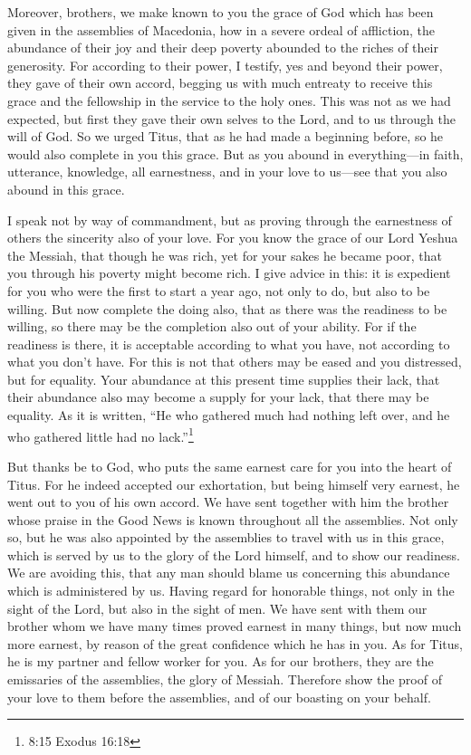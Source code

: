 \mychapter{} \myverse*{}Moreover, brothers, we make known to you the grace of God which
has been given in the assemblies of Macedonia,
\myverse{}how in a severe ordeal of affliction, the abundance of their joy and their deep
poverty abounded to the riches of their generosity.
\myverse{}For according to their power, I testify, yes and beyond their power, they gave
of their own accord,
\myverse{}begging us with much entreaty to receive this grace and the fellowship in the
service to the holy ones.
\myverse{}This was not as we had expected, but first they gave their own selves to the
Lord, and to us through the will of God.
\myverse{}So we urged Titus, that as he had made a beginning before, so he would also
complete in you this grace.
\myverse{}But as you abound in everything—in faith, utterance, knowledge, all earnestness,
and in your love to us—see that you also abound in this grace.

\myverse{}I speak not by way of commandment, but as proving through the earnestness
of others the sincerity also of your love.
\myverse{}For you know the grace of our Lord Yeshua the Messiah, that though he was rich,
yet for your sakes he became poor, that you through his poverty might become rich.
\myverse{}I give advice in this: it is expedient for you who were the first to start
a year ago, not only to do, but also to be willing.
\myverse{}But now complete the doing also, that as there was the readiness to be willing,
so there may be the completion also out of your ability.
\myverse{}For if the readiness is there, it is acceptable according to what you have,
not according to what you don’t have.
\myverse{}For this is not that others may be eased and you distressed,
\myverse{}but for equality. Your abundance at this present time supplies their lack,
that their abundance also may become a supply for your lack, that there may be equality.
\myverse{}As it is written, “He who gathered much had nothing left over, and he who
gathered little had no lack.”\footnote{8:15 Exodus 16:18}

\myverse{}But thanks be to God, who puts the same earnest care for you
into the heart of Titus.
\myverse{}For he indeed accepted our exhortation, but being himself very earnest, he
went out to you of his own accord.
\myverse{}We have sent together with him the brother whose praise in the Good News is
known throughout all the assemblies.
\myverse{}Not only so, but he was also appointed by the assemblies to travel with us
in this grace, which is served by us to the glory of the Lord himself, and to show our readiness.
\myverse{}We are avoiding this, that any man should blame us concerning this abundance
which is administered by us.
\myverse{}Having regard for honorable things, not only in the sight of the Lord, but
also in the sight of men.
\myverse{}We have sent with them our brother whom we have many times proved earnest
in many things, but now much more earnest, by reason of the great confidence which he has in you.
\myverse{}As for Titus, he is my partner and fellow worker for you. As for our brothers,
they are the emissaries of the assemblies, the glory of Messiah.
\myverse{}Therefore show the proof of your love to them before the assemblies, and of
our boasting on your behalf.


